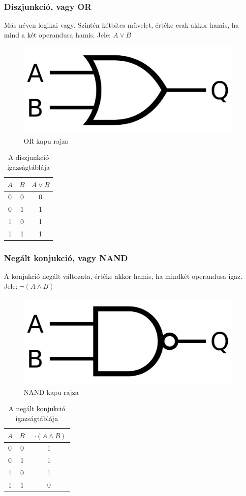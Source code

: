 \documentclass[
]{thesis-ekf}
\theoremstyle{definition}
\theoremstyle{remark}
\begin{document}
\subsubsection{Diszjunkció, vagy OR}
Más néven logikai vagy. Szintén kétbites művelet, értéke csak akkor hamis, ha mind a két operandusa hamis. Jele: $A \lor B$

\begin{figure}[H]
	\centering
	\includegraphics[width=0.3\linewidth]{or}
	\caption{OR kapu rajza}
	\label{fig:or}
\end{figure}


\begin{table}[H]
	\centering
	\begin{tabular}{c|c|c}
		$A$ & $B$ & $A \lor B$\\               
		\hline
		0 & 0 & 0\\
		0 & 1 & 1\\
		1 & 0 & 1\\
		1 & 1 & 1
	\end{tabular}
	\caption{A diszjunkció igazságtáblája}
\end{table}

\subsubsection{Negált konjukció, vagy NAND}
A konjukció negált változata, értéke akkor hamis, ha mindkét operandusa igaz. Jele: $\neg(A \land B)$

\begin{figure}[H]
	\centering
	\includegraphics[width=0.3\linewidth]{nand}
	\caption{NAND kapu rajza}
	\label{fig:nand}
\end{figure}


\begin{table}[H]
	\centering
	\begin{tabular}{c|c|c}
		$A$ & $B$ & $\neg(A \land B)$\\               
		\hline
		0 & 0 & 1\\
		0 & 1 & 1\\
		1 & 0 & 1\\
		1 & 1 & 0
	\end{tabular}
	\caption{A negált konjukció igazságtáblája}
\end{table}
\end{document}
